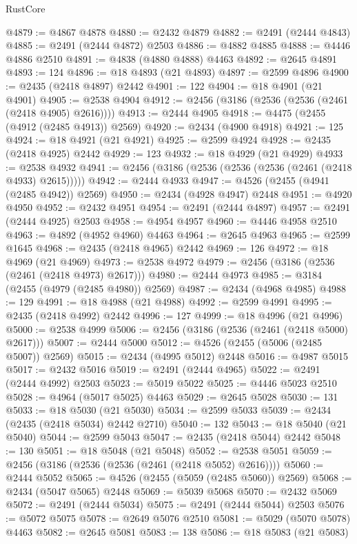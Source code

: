 \begin{lexlean}{RustCore}
\begin{coremodule}
@4879 := @4867 @4878
@4880 := @2432 @4879
@4882 := @2491 (@2444 @4843)
@4885 := @2491 (@2444 @4872) @2503
@4886 := @4882 @4885
@4888 := @4446 @4886 @2510
@4891 := @4838 (@4880 @4888) @4463
@4892 := @2645 @4891
@4893 := 124
@4896 := @18 @4893 (@21 @4893)
@4897 := @2599 @4896
@4900 := @2435 (@2418 @4897) @2442
@4901 := 122
@4904 := @18 @4901 (@21 @4901)
@4905 := @2538 @4904
@4912 := @2456 (@3186 (@2536 (@2536 (@2461 (@2418 @4905) @2616))))
@4913 := @2444 @4905
@4918 := @4475 (@2455 (@4912 (@2485 @4913)) @2569)
@4920 := @2434 (@4900 @4918)
@4921 := 125
@4924 := @18 @4921 (@21 @4921)
@4925 := @2599 @4924
@4928 := @2435 (@2418 @4925) @2442
@4929 := 123
@4932 := @18 @4929 (@21 @4929)
@4933 := @2538 @4932
@4941 := @2456 (@3186 (@2536 (@2536 (@2536 (@2461 (@2418 @4933) @2615)))))
@4942 := @2444 @4933
@4947 := @4526 (@2455 (@4941 (@2485 @4942)) @2569)
@4950 := @2434 (@4928 @4947) @2448
@4951 := @4920 @4950
@4952 := @2432 @4951
@4954 := @2491 (@2444 @4897)
@4957 := @2491 (@2444 @4925) @2503
@4958 := @4954 @4957
@4960 := @4446 @4958 @2510
@4963 := @4892 (@4952 @4960) @4463
@4964 := @2645 @4963
@4965 := @2599 @1645
@4968 := @2435 (@2418 @4965) @2442
@4969 := 126
@4972 := @18 @4969 (@21 @4969)
@4973 := @2538 @4972
@4979 := @2456 (@3186 (@2536 (@2461 (@2418 @4973) @2617)))
@4980 := @2444 @4973
@4985 := @3184 (@2455 (@4979 (@2485 @4980)) @2569)
@4987 := @2434 (@4968 @4985)
@4988 := 129
@4991 := @18 @4988 (@21 @4988)
@4992 := @2599 @4991
@4995 := @2435 (@2418 @4992) @2442
@4996 := 127
@4999 := @18 @4996 (@21 @4996)
@5000 := @2538 @4999
@5006 := @2456 (@3186 (@2536 (@2461 (@2418 @5000) @2617)))
@5007 := @2444 @5000
@5012 := @4526 (@2455 (@5006 (@2485 @5007)) @2569)
@5015 := @2434 (@4995 @5012) @2448
@5016 := @4987 @5015
@5017 := @2432 @5016
@5019 := @2491 (@2444 @4965)
@5022 := @2491 (@2444 @4992) @2503
@5023 := @5019 @5022
@5025 := @4446 @5023 @2510
@5028 := @4964 (@5017 @5025) @4463
@5029 := @2645 @5028
@5030 := 131
@5033 := @18 @5030 (@21 @5030)
@5034 := @2599 @5033
@5039 := @2434 (@2435 (@2418 @5034) @2442 @2710)
@5040 := 132
@5043 := @18 @5040 (@21 @5040)
@5044 := @2599 @5043
@5047 := @2435 (@2418 @5044) @2442
@5048 := 130
@5051 := @18 @5048 (@21 @5048)
@5052 := @2538 @5051
@5059 := @2456 (@3186 (@2536 (@2536 (@2461 (@2418 @5052) @2616))))
@5060 := @2444 @5052
@5065 := @4526 (@2455 (@5059 (@2485 @5060)) @2569)
@5068 := @2434 (@5047 @5065) @2448
@5069 := @5039 @5068
@5070 := @2432 @5069
@5072 := @2491 (@2444 @5034)
@5075 := @2491 (@2444 @5044) @2503
@5076 := @5072 @5075
@5078 := @2649 @5076 @2510
@5081 := @5029 (@5070 @5078) @4463
@5082 := @2645 @5081
@5083 := 138
@5086 := @18 @5083 (@21 @5083)

\end{coremodule}
\end{lexlean}
